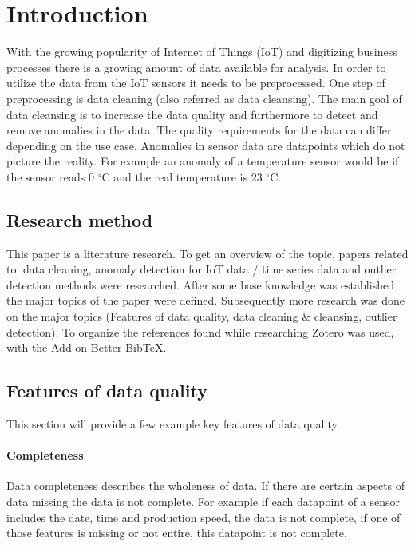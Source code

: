\chapter{Introduction}\label{chapter:introduction}

With the growing popularity of Internet of Things (\ac{IoT}) and digitizing business processes there is a growing amount of data available for analysis.
In order to utilize the data from the IoT sensors it needs to be preprocessed. One step of preprocessing is data cleaning (also referred as data cleansing).
The main goal of data cleansing is to increase the data quality and furthermore to detect and remove anomalies in the data. The quality requirements for the data can differ depending on the use case. Anomalies in sensor data are datapoints which do not picture the reality. For example an anomaly of a temperature sensor would be if the sensor reads 0 $^{\circ}$C and the real temperature is 23 $^{\circ}$C.

\section{Research method}
This paper is a literature research. To get an overview of the topic, papers related to: data cleaning, anomaly detection for IoT data / time series data and outlier detection methods were researched. After some base knowledge was established the major topics of the paper were defined. Subsequently more research was done on the major topics (Features of data quality, data cleaning \& cleansing, outlier detection). To organize the references found while researching Zotero was used, with the Add-on Better BibTeX.

\section{Features of data quality}\label{section:data-quality-features}
This section will provide a few example key features of data quality. 
\subsubsection{Completeness}
Data completeness describes the wholeness of data. If there are certain aspects of data missing the data is not complete. For example if each datapoint of a sensor includes the date, time and production speed, the data is not complete, if one of those features is missing or not entire, this datapoint is not complete. \cite{caiChallengesDataQuality2015, songIoTDataQuality2020}
